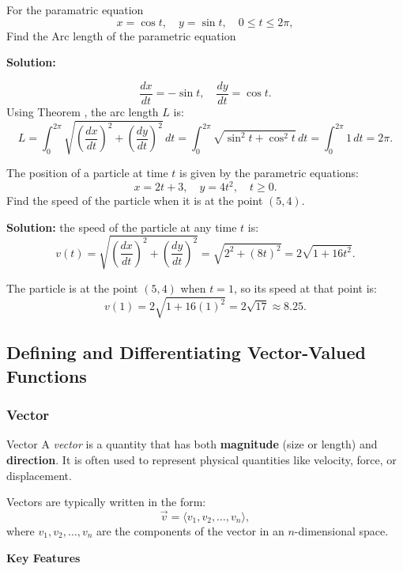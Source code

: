 \documentclass[12pt]{article}
\theoremstyle{beautifulthm}
\begin{document}
\begin{tcolorbox}[colback=examplebg, colframe=red!75!black, title=\textbf{EXAMPLE 1: Arc Length of Parametric Equation}, fonttitle=\bfseries, sharp corners]

For the paramatric equation
\[
x = \cos t, \quad y = \sin t, \quad 0 \leq t \leq 2\pi,
\]
Find the Arc length of the parametric equation 


\tcblower
\textbf{Solution:} 

\[
\frac{dx}{dt} = -\sin t, \quad \frac{dy}{dt} = \cos t.
\]
Using Theorem , the arc length $L$ is:
\[
L = \int_0^{2\pi} \sqrt{\left(\frac{dx}{dt}\right)^2 + \left(\frac{dy}{dt}\right)^2} \, dt = \int_0^{2\pi} \sqrt{\sin^2 t + \cos^2 t} \, dt = \int_0^{2\pi} 1 \, dt = 2\pi.
\]
\end{tcolorbox}



\begin{tcolorbox}[colback=examplebg, colframe=red!75!black, title=\textbf{EXAMPLE 2: Arc Length of Parametric Equation}, fonttitle=\bfseries, sharp corners]

The position of a particle at time $t$ is given by the parametric equations:
\[
x = 2t + 3, \quad y = 4t^2, \quad t \geq 0.
\]
Find the speed of the particle when it is at the point $(5, 4)$.

\tcblower
\textbf{Solution:} 
 the speed of the particle at any time $t$ is:
\[
v(t) = \sqrt{\left(\frac{dx}{dt}\right)^2 + \left(\frac{dy}{dt}\right)^2} = \sqrt{2^2 + (8t)^2} = 2\sqrt{1 + 16t^2}.
\]

The particle is at the point $(5, 4)$ when $t = 1$, so its speed at that point is:
\[
v(1) = 2\sqrt{1 + 16(1)^2} = 2\sqrt{17} \approx 8.25.
\]

\end{tcolorbox}


\newpage

\subsection{Defining and Differentiating Vector-Valued Functions}
\subsubsection{Vector}

\begin{Definition}{Vector}{}
A \textit{vector} is a quantity that has both \textbf{magnitude} (size or length) and \textbf{direction}. It is often used to represent physical quantities like velocity, force, or displacement. 

Vectors are typically written in the form:
\[
\vec{v} = \langle v_1, v_2, \dots, v_n \rangle,
\]
where $v_1, v_2, \dots, v_n$ are the components of the vector in an $n$-dimensional space.
\end{Definition}
\textbf{Key Features}
\end{document}
